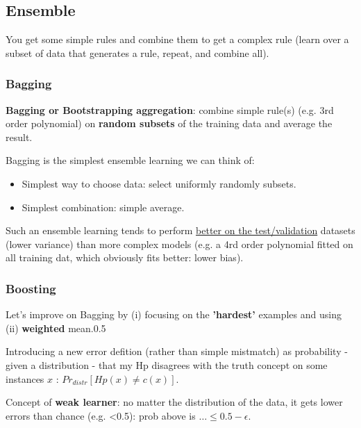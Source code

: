 \documentclass[11pt]{article}
\begin{document}
\subsection{Ensemble}
You get some simple rules and combine them to get a complex rule (learn over a subset of data that generates a rule, repeat, and combine all).

%
\subsubsection{Bagging}
\textbf{Bagging or Bootstrapping aggregation}: combine simple rule(s) (e.g. 3rd order polynomial) on \textbf{random subsets} of the training data and average the result. 

Bagging is the simplest ensemble learning we can think of: 
\begin{itemize}
	\item Simplest way to choose data: select uniformly randomly subsets.
	\item Simplest combination: simple average.
\end{itemize}

Such an ensemble learning tends to perform \underline{better on the test/validation} datasets (lower variance) than more complex models (e.g. a 4rd order polynomial fitted on all training dat, which obviously fits better: lower bias).

%
\subsubsection{Boosting}
Let's improve on Bagging by (i) focusing on the \textbf{'hardest'} examples and using (ii) \textbf{weighted} mean.0.5

Introducing a new error defition (rather than simple mistmatch) as probability - given a distribution - that my Hp disagrees with the truth concept on some instances $x$ : $Pr_{distr}[Hp(x) \neq c(x)]$. 

Concept of \textbf{weak learner}: no matter the distribution of the data, it gets lower errors than chance (e.g. <0.5): prob above is $ \ldots \leq 0.5 - \epsilon$.
\end{document}
